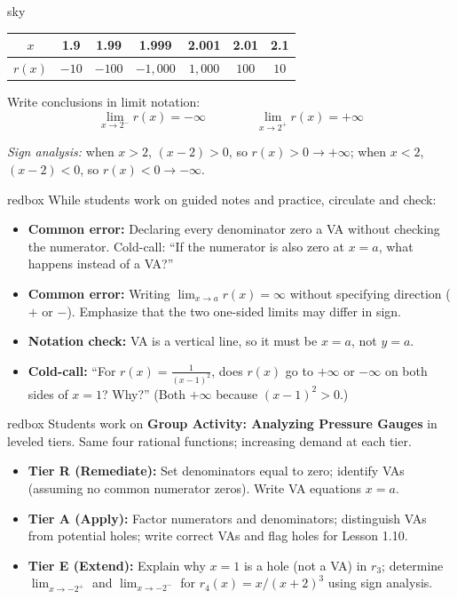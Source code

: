 \documentclass[10pt]{article}
\begin{document}
\begin{skillbox}[Lesson]{sky}
\smallskip
\renewcommand{\arraystretch}{1.3}
\begin{tabular}{|c|c|c|c|c|c|c|}
\hline
$x$    & 1.9 & 1.99 & 1.999 & 2.001 & 2.01 & 2.1 \\
\hline
$r(x)$ & $-10$ & $-100$ & $-1{,}000$ & $1{,}000$ & $100$ & $10$ \\
\hline
\end{tabular}
\smallskip

Write conclusions in limit notation:
\[
  \lim_{x \to 2^-} r(x) = -\infty
  \qquad\qquad
  \lim_{x \to 2^+} r(x) = +\infty
\]

\textit{Sign analysis:} when $x > 2$, $(x-2) > 0$, so $r(x) > 0 \to +\infty$; when $x < 2$,
$(x-2) < 0$, so $r(x) < 0 \to -\infty$.
\end{skillbox}

\begin{skillbox}{redbox}
While students work on guided notes and practice, circulate and check:
\begin{itemize}
  \item \textbf{Common error:} Declaring every denominator zero a VA without checking the numerator.
        Cold-call: ``If the numerator is also zero at $x = a$, what happens instead of a VA?''
  \item \textbf{Common error:} Writing $\lim_{x\to a} r(x) = \infty$ without specifying direction
        ($+$ or $-$). Emphasize that the two one-sided limits may differ in sign.
  \item \textbf{Notation check:} VA is a vertical line, so it must be $x = a$, not $y = a$.
  \item \textbf{Cold-call:} ``For $r(x) = \frac{1}{(x-1)^2}$, does $r(x)$ go to $+\infty$ or
        $-\infty$ on both sides of $x = 1$? Why?'' (Both $+\infty$ because $(x-1)^2 > 0$.)
\end{itemize}
\end{skillbox}

\begin{skillbox}{redbox}
Students work on \textbf{Group Activity: Analyzing Pressure Gauges} in leveled tiers.
Same four rational functions; increasing demand at each tier.

\begin{itemize}
  \item \textbf{Tier R (Remediate):} Set denominators equal to zero; identify VAs (assuming no
        common numerator zeros). Write VA equations $x = a$.
  \item \textbf{Tier A (Apply):} Factor numerators and denominators; distinguish VAs from potential
        holes; write correct VAs and flag holes for Lesson 1.10.
  \item \textbf{Tier E (Extend):} Explain why $x = 1$ is a hole (not a VA) in $r_3$; determine
        $\lim_{x\to -2^+}$ and $\lim_{x\to -2^-}$ for $r_4(x) = x/(x+2)^3$ using sign analysis.
\end{itemize}
\end{skillbox}
\end{document}
